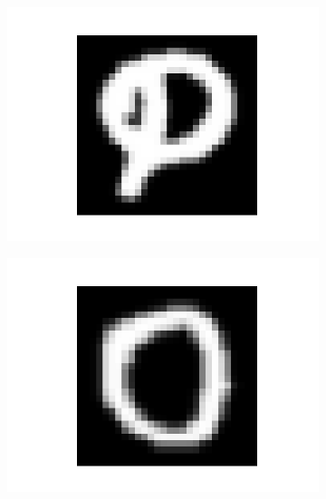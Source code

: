 \documentclass[14pt,a4paper]{extarticle}
\begin{document}
\begin{figure}[htb]
\begin{subfigure}[b]{0.3\textwidth}
    \includegraphics[width=\textwidth]{../res/emnist/sample_2.png}
    \label{fig:emnist_sample_2}
  \end{subfigure}
  \hfill
  \begin{subfigure}[b]{0.3\textwidth}
    \includegraphics[width=\textwidth]{../res/emnist/sample_3.png}
    \label{fig:emnist_sample_3}
  \end{subfigure}
  \hfill
  \begin{subfigure}[b]{0.3\textwidth}

\end{subfigure}
\end{figure}
\end{document}
